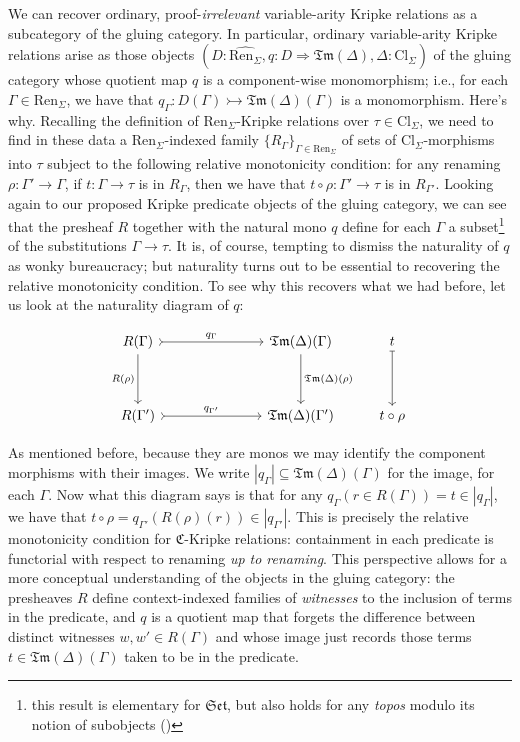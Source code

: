 \documentclass[12pt,twoside]{reedthesis}
\theoremstyle{definition}
\theoremstyle{remark}
\theoremstyle{plain}
\newcommand{\cl}{\text{Cl}_\Sigma}
\newcommand{\ren}{\text{Ren}_\Sigma}
\newcommand{\renhat}{\hat{\ren}}
\newcommand{\tm}{\mathfrak{Tm}}
\newcommand{\catset}{\mathfrak{Set}}
\begin{document}
We can recover ordinary, proof-\emph{irrelevant} variable-arity Kripke relations
as a subcategory of the gluing category. In particular, ordinary variable-arity
Kripke relations arise as those objects
\( (D : \renhat, q : D \Longrightarrow \tm (\Delta), \Delta : \cl) \) of the gluing category whose
quotient map $q$ is a component-wise monomorphism; i.e., for each
\( \Gamma \in \ren \), we have that \( q_{\Gamma} : D(\Gamma) \rightarrowtail \tm (\Delta)(\Gamma) \) is a monomorphism.
Here's why. Recalling the definition of $\ren$-Kripke relations over $\tau \in \cl$,
we need to find in these data a $\ren$-indexed family \( \{ R_{\Gamma}\}_{\Gamma \in \ren}\)
of sets of $\cl$-morphisms into \( \tau \) subject to the following relative
monotonicity condition: for any renaming \( \rho : \Gamma' \rightarrow \Gamma \), if \( t : \Gamma \rightarrow \tau \) is
in \( R_{\Gamma}\), then we have that \( t \circ \rho : \Gamma' \rightarrow \tau \) is in \( R_{\Gamma'}\). Looking
again to our proposed Kripke predicate objects of the gluing category, we can
see that the presheaf \( R \) together with the natural mono \( q \) define for
each \( \Gamma \) a subset\footnote{this result is elementary for $\catset$, but also
  holds for any \emph{topos} modulo its notion of subobjects
  (\cite{leinster_informal_2011})} of the substitutions \( \Gamma \rightarrow \tau \). It is, of
course, tempting to dismiss the naturality of $q$ as wonky bureaucracy; but
naturality turns out to be essential to recovering the relative monotonicity
condition. To see why this recovers what we had before, let us look at the
naturality diagram of \( q \):

  \[\begin{tikzcd}
      {R (\Gamma)} &&& {\tm(\Delta) (\Gamma)} & t \\
      \\
      {R (\Gamma')} &&& {\tm(\Delta) (\Gamma')} & {t \circ \rho}
      \arrow["{q_{\Gamma}}", from=1-1, to=1-4, rightarrowtail]
      \arrow["{q_{\Gamma'}}", from=3-1, to=3-4, rightarrowtail]
      \arrow["{R (\rho)}"', from=1-1, to=3-1]
      \arrow["{\tm(\Delta) (\rho)}", from=1-4, to=3-4]
      \arrow[from=1-5, to=3-5, mapsto]
    \end{tikzcd}\]

  As mentioned before, because they are monos we may identify the component
  morphisms with their images. We write \( |q_{\Gamma}| \subseteq \tm(\Delta)(\Gamma) \) for the image,
  for each \( \Gamma \). Now what this diagram says is that for any
  \( q_{\Gamma }(r \in R(\Gamma)) = t \in |q_{\Gamma}|\), we have that
  \( t \circ \rho = q_{\Gamma'}(R(\rho)(r)) \in |q_{\Gamma'}|\). This is precisely the relative
  monotonicity condition for $\mathfrak{C}$-Kripke relations: containment in
  each predicate is functorial with respect to renaming \emph{up to renaming}.
  This perspective allows for a more conceptual understanding of the objects in
  the gluing category: the presheaves $R$ define context-indexed families of
  \emph{witnesses} to the inclusion of terms in the predicate, and $q$ is a
  quotient map that forgets the difference between distinct witnesses
  \( w, w' \in R(\Gamma) \) and whose image just records those terms
  \( t \in \tm (\Delta)(\Gamma)\) taken to be in the predicate.
\end{document}
